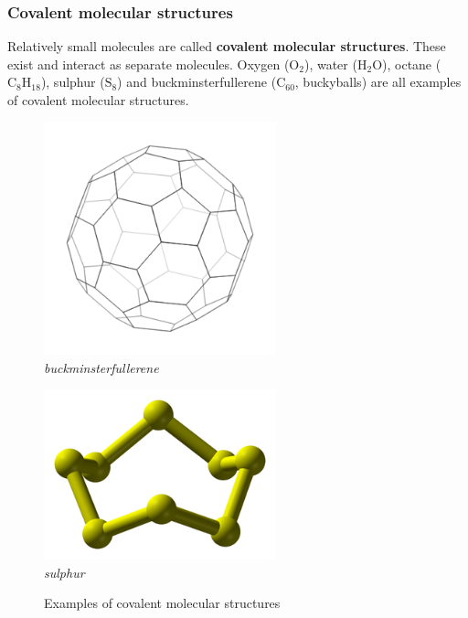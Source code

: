 \subsubsection*{Covalent molecular structures}
Relatively small molecules are called \textbf{covalent molecular structures}. These exist and interact as separate molecules. Oxygen ($\text{O}_{2}$), water ($\text{H}_{2}\text{O}$), octane ($\text{C}_{8}\text{H}_{18}$), sulphur ($\text{S}_{8}$) and buckminsterfullerene ($\text{C}_{60}$, buckyballs) are all examples of covalent molecular structures. \\
\begin{figure}[H]
  \begin{center}
  \begin{minipage}[c]{5 cm}
    \includegraphics[width=0.6\textwidth]{photos/Buckyball_Carbon.png} \\
    \textsl{buckminsterfullerene}
  \end{minipage}
  \begin{minipage}[c]{5 cm}
    \includegraphics[width=0.6\textwidth]{photos/sulphur_wikipedia.png}  \\ 
    \textsl{sulphur}
  \end{minipage}
\caption{Examples of covalent molecular structures}
\end{center}
\end{figure}

